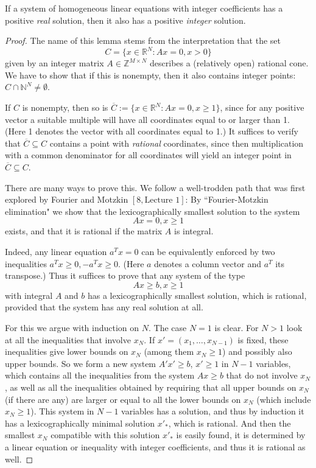 \begin{lemma}
  \label{cone_lemma}
  If a system of homogeneous linear equations with integer
  coefficients has a positive \emph{real} solution, then it also has a positive
  \emph{integer} solution.
\end{lemma}
\begin{proof}
   The name of this lemma stems from the interpretation that the set
  \[
  C = \{x \in \mathbb{R}^N : Ax = 0, x > 0\}
  \]
  given by an integer matrix \( A \in \mathbb{Z}^{M \times N} \) describes a (relatively open) rational
  cone. We have to show that if this is nonempty, then it also contains integer
  points: \( C \cap \mathbb{N}^N \neq \emptyset \).

  If \( C \) is nonempty, then so is \(\overline{C} := \{x \in \mathbb{R}^N : Ax = 0, x \geq 1\}\), since
  for any positive vector a suitable multiple will have all coordinates equal to or
  larger than 1. (Here 1 denotes the vector with all coordinates equal to 1.)
  It suffices to verify that \( \overline{C} \subseteq C \) contains a point with \emph{rational} coordinates,
  since then multiplication with a common denominator for all coordinates
  will yield an integer point in \( \overline{C} \subseteq C \).

  There are many ways to prove this. We follow a well-trodden path that was
  first explored by Fourier and Motzkin \([8, \text{Lecture 1}]\): By ``Fourier-Motzkin
  elimination" we show that the lexicographically smallest solution to the
  system
  \[
  Ax = 0, x \geq 1
  \]
  exists, and that it is rational if the matrix \( A \) is integral.

  Indeed, any linear equation \( a^T x = 0 \) can be equivalently enforced by two
  inequalities \( a^T x \geq 0, -a^T x \geq 0 \). (Here \( a \) denotes a column vector and
  \( a^T \) its transpose.) Thus it suffices to prove that any system of the type
  \[
  Ax \geq b, x \geq 1
  \]
  with integral \( A \) and \( b \) has a lexicographically smallest solution, which is
  rational, provided that the system has any real solution at all.

  For this we argue with induction on \( N \). The case \( N = 1 \) is clear. For \( N > 1 \)
  look at all the inequalities that involve \( x_N \). If \( x' = (x_1, \ldots, x_{N-1}) \) is fixed,
  these inequalities give lower bounds on \( x_N \) (among them \( x_N \geq 1 \)) and
  possibly also upper bounds. So we form a new system \( A' x' \geq b \), \( x' \geq 1 \)
  in \( N-1 \) variables, which contains all the inequalities from the system
  \( Ax \geq b \) that do not involve \( x_N \), as well as all the inequalities obtained
  by requiring that all upper bounds on \( x_N \) (if there are any) are larger or
  equal to all the lower bounds on \( x_N \) (which include \( x_N \geq 1 \)). This system
  in \( N-1 \) variables has a solution, and thus by induction it has a lexicographically
  minimal solution \( x'_*\), which is rational. And then the smallest
  \( x_N \) compatible with this solution \( x'_*\) is easily found, it is determined by a
  linear equation or inequality with integer coefficients, and thus it is rational as well.
\end{proof}


